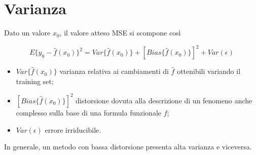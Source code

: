 \section{Varianza}

Dato un valore $x_0$, il valore atteso MSE si scompone così

\begin{equation}
E\{y_0-\hat{f}(x_0)\}^2 = Var\{\hat{f}(x_0)\} + [Bias\{\hat{f}(x_0)\}]^2 + Var(\epsilon)
\end{equation}

\begin{itemize}
\item $Var\{\hat{f}(x_0)\}$ varianza relativa ai cambiamenti di $\hat{f}$ ottenibili variando il training set;
\item $[Bias\{\hat{f}(x_0)\}]^2$ distorsione dovuta alla descrizione di un fenomeno anche complesso sulla base di una formula funzionale $f$;
\item $Var(\epsilon)$ errore irriducibile.
\end{itemize}

In generale, un metodo con bassa distorsione presenta alta varianza e viceversa.